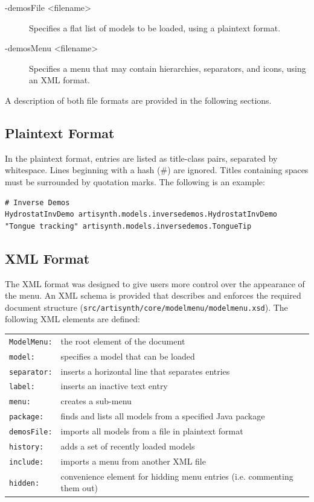 \documentclass{article}
\begin{document}
\begin{description}

\item[-demosFile <filename>]
Specifies a flat list of models to be loaded, using a plaintext
format.

\item[-demosMenu <filename>]
Specifies a menu that may contain hierarchies, separators, and icons,
using an XML format.

\end{description}

A description of both file formats are provided in the following sections.

\subsection{Plaintext Format \label{sec:menu:plaintext}}

In the plaintext format, entries are listed as title-class pairs, separated by
whitespace.  Lines beginning with a hash (\#) are ignored.  Titles containing
spaces must be surrounded by quotation marks.  The following is an example:

\begin{lstlisting}[]
# Inverse Demos
HydrostatInvDemo artisynth.models.inversedemos.HydrostatInvDemo
"Tongue tracking" artisynth.models.inversedemos.TongueTip   
\end{lstlisting}

\subsection{XML Format \label{sec:menu:xml}}

The XML format was designed to give users more control over the appearance of
the menu.  An XML schema is provided that describes and enforces the required
document structure ({\tt src/artisynth/core/modelmenu/modelmenu.xsd}).  The 
following XML elements are defined:
\medskip

\begin{tabular}{ll}
{\tt ModelMenu:} & the root element of the document\\
{\tt model:} & specifies a model that can be loaded\\
{\tt separator:} & inserts a horizontal line that separates entries\\
{\tt label:} & inserts an inactive text entry\\
{\tt menu:} & creates a sub-menu\\
{\tt package:} & finds and lists all models from a specified Java package\\
{\tt demosFile:} & imports all models from a file in plaintext format\\
{\tt history:} & adds a set of recently loaded models\\
{\tt include:} & imports a menu from another XML file\\
{\tt hidden: } & convenience element for hidding menu entries (i.e. commenting
   them out)
\end{tabular}
\medskip
\end{document}
